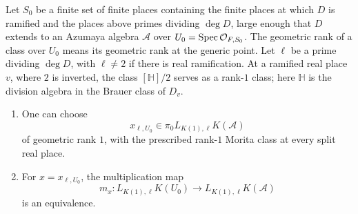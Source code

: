 \begin{lemma}
\label{lem:paper-lca-common-model}
Let $S_0$ be a finite set of finite places containing the finite places at which $D$ is ramified and the places above primes dividing $\deg D$, large enough that $D$ extends to an Azumaya algebra $\mathcal A$ over $U_0=\operatorname{Spec}\mathcal O_{F,S_0}$.
The geometric rank of a class over $U_0$ means its geometric rank at the generic point.
Let $\ell$ be a prime dividing $\deg D$, with $\ell\ne2$ if there is real ramification.
At a ramified real place $v$, where $2$ is inverted, the class $[\mathbb H]/2$ serves as a rank-$1$ class; here $\mathbb H$ is the division algebra in the Brauer class of $D_v$.
\begin{enumerate}
\item One can choose
\[
 x_{\ell,U_0}\in\pi_0L_{K(1),\ell}K(\mathcal A)
\]
of geometric rank $1$, with the prescribed rank-$1$ Morita class at every split real place.
\item For $x=x_{\ell,U_0}$, the multiplication map
\[
 m_x\colon L_{K(1),\ell}K(U_0)\longrightarrow L_{K(1),\ell}K(\mathcal A)
\]
is an equivalence.
\end{enumerate}
\end{lemma}
